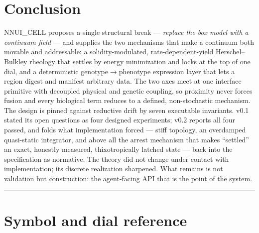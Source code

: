 \documentclass[11pt]{article}
\begin{document}
\section{Conclusion}

NNUI\_CELL proposes a single structural break --- \emph{replace the box model with a continuum
field} --- and supplies the two mechanisms that make a continuum both movable and addressable: a
solidity-modulated, rate-dependent-yield Herschel--Bulkley rheology that settles by energy
minimization and locks at the top of one dial, and a deterministic genotype$\rightarrow$phenotype
expression layer that lets a region digest and manifest arbitrary data. The two axes meet at one
interface primitive with decoupled physical and genetic coupling, so proximity never forces
fusion and every biological term reduces to a defined, non-stochastic mechanism. The design is
pinned against reductive drift by seven executable invariants. v0.1 stated its open questions as
four designed experiments; v0.2 reports all four passed, and folds what implementation forced
--- stiff topology, an overdamped quasi-static integrator, and above all the arrest mechanism
that makes ``settled'' an exact, honestly measured, thixotropically latched state --- back into
the specification as normative. The theory did not change under contact with implementation; its
discrete realization sharpened. What remains is not validation but construction: the
agent-facing API that is the point of the system.

\vspace{1em}
\noindent\textcolor{rule}{\rule{\linewidth}{0.8pt}}
\vspace{0.4em}


\appendix
\section{Symbol and dial reference}
\end{document}
